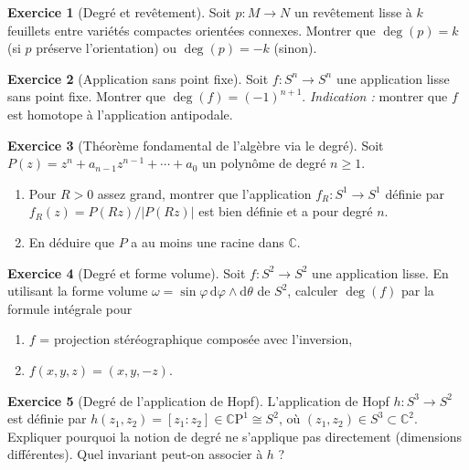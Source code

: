 \documentclass[12pt,a4paper,openany]{book}
\theoremstyle{definition}
\newtheorem{exercice}{Exercice}[chapter]
\theoremstyle{plain}
\theoremstyle{remark}
\newcommand{\C}{\mathbb{C}}
\newcommand{\CP}{\mathbb{C}\mathrm{P}}
\newcommand{\dd}{\mathrm{d}}
\newcommand{\abs}[1]{\left|#1\right|}
\begin{document}
\begin{exercice}[Degré et revêtement]\label{exo:degre-2}
Soit $p : M \to N$ un revêtement lisse à $k$ feuillets entre variétés compactes
orientées connexes. Montrer que $\deg(p) = k$ (si $p$ préserve l'orientation) ou
$\deg(p) = -k$ (sinon).
\end{exercice}

\begin{exercice}[Application sans point fixe]\label{exo:degre-3}
Soit $f : S^n \to S^n$ une application lisse sans point fixe. Montrer que
$\deg(f) = (-1)^{n+1}$. \emph{Indication :} montrer que $f$ est homotope à
l'application antipodale.
\end{exercice}

\begin{exercice}[Théorème fondamental de l'algèbre via le degré]\label{exo:degre-4}
Soit $P(z) = z^n + a_{n-1}z^{n-1} + \cdots + a_0$ un polynôme de degré $n \geqslant 1$.
\begin{enumerate}[label=(\alph*)]
  \item Pour $R > 0$ assez grand, montrer que l'application
    $f_R : S^1 \to S^1$ définie par $f_R(z) = P(Rz)/\abs{P(Rz)}$ est bien
    définie et a pour degré $n$.
  \item En déduire que $P$ a au moins une racine dans $\C$.
\end{enumerate}
\end{exercice}

\begin{exercice}[Degré et forme volume]\label{exo:degre-5}
Soit $f : S^2 \to S^2$ une application lisse. En utilisant la forme volume
$\omega = \sin\varphi \, \dd\varphi \wedge \dd\theta$ de $S^2$, calculer
$\deg(f)$ par la formule intégrale pour
\begin{enumerate}[label=(\alph*)]
  \item $f$ = projection stéréographique composée avec l'inversion,
  \item $f(x,y,z) = (x,y,-z)$.
\end{enumerate}
\end{exercice}

\begin{exercice}[Degré de l'application de Hopf]\label{exo:degre-6}
L'application de Hopf $h : S^3 \to S^2$ est définie par
$h(z_1, z_2) = [z_1 : z_2] \in \CP^1 \cong S^2$, où $(z_1, z_2) \in S^3 \subset \C^2$.
Expliquer pourquoi la notion de degré ne s'applique pas directement (dimensions
différentes). Quel invariant peut-on associer à $h$ ?
\end{exercice}
\end{document}
